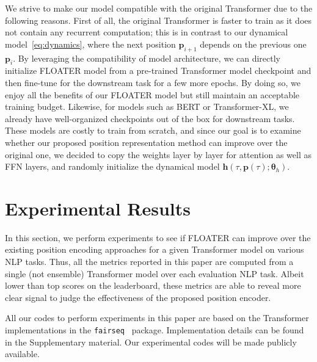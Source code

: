\documentclass[11pt]{article}
\def\vtheta{{\bm{\theta}}}
\def\vh{{\bm{h}}}
\def\vp{{\bm{p}}}
\begin{document}
We strive to make our model compatible with the original Transformer due to the following reasons. First of all, the original Transformer is faster to train as it does not contain any recurrent computation; this is in contrast to our dynamical model~\eqref{eq:dynamics}, where the next position $\vp_{i+1}$ depends on the previous one $\vp_{i}$. By leveraging the compatibility of model architecture, we can directly initialize FLOATER model from a pre-trained Transformer model checkpoint and then fine-tune for the downstream task for a few more epochs. By doing so, we enjoy all the benefits of our FLOATER model but still maintain an acceptable training budget. Likewise, for models such as BERT or Transformer-XL, we already have well-organized checkpoints out of the box for downstream tasks. These models are costly to train from scratch, and since our goal is to examine whether our proposed position representation method can improve over the original one, we decided to copy the weights layer by layer for attention as well as FFN layers, and randomly initialize the dynamical model $\vh(\tau, \vp(\tau); \vtheta_h)$.



\section{Experimental Results}
\label{sec:exp}
In this section, we perform experiments to see if FLOATER can improve over the existing position encoding approaches for a given Transformer model on various NLP tasks. 
Thus, all the metrics reported in this paper are computed from a single (not ensemble) Transformer model over each evaluation NLP task. Albeit lower than top scores on the leaderboard, these metrics are able to reveal more clear signal to judge the effectiveness of the proposed position encoder.   

All our codes to perform experiments in this paper are based on the Transformer implementations in the \texttt{fairseq}~\cite{ott2019fairseq} package. Implementation details can be found in the Supplementary material. Our experimental codes will be made publicly available. 
\end{document}
